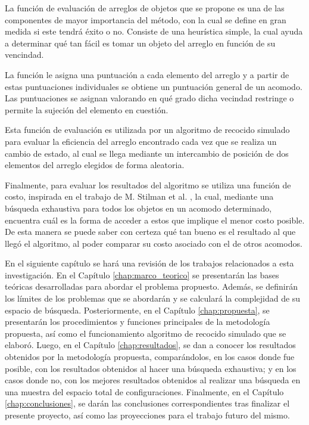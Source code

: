 La función de evaluación de arreglos de objetos que se propone es una de las componentes de mayor importancia del método, con la cual se define en gran medida si este tendrá éxito o no.
Consiste de una heurística simple, la cual ayuda a determinar qué tan fácil es tomar un objeto del arreglo en función de su vencindad.

La función le asigna una puntuación a cada elemento del arreglo y a partir de estas puntuaciones individuales se obtiene un puntuación general de un acomodo.
Las puntuaciones se asignan valorando en qué grado dicha vecindad restringe o permite la sujeción del elemento en cuestión.

Esta función de evaluación es utilizada por un algoritmo de recocido simulado para evaluar la eficiencia del arreglo encontrado cada vez que se realiza un cambio de estado, al cual se llega mediante un intercambio de posición de dos elementos del arreglo elegidos de forma aleatoria.

Finalmente, para evaluar los resultados del algoritmo se utiliza una función de costo, inspirada en el trabajo de M. Stilman et al. \cite{4209604}, la cual, mediante una búsqueda exhaustiva para todos los objetos en un acomodo determinado, encuentra cuál es la forma de acceder a estos que implique el menor costo posible.
De esta manera se puede saber con certeza qué tan bueno es el resultado al que llegó el algoritmo, al poder comparar su costo asociado con el de otros acomodos.

En el siguiente capítulo se hará una revisión de los trabajos relacionados a esta investigación.
En el Capítulo \ref{chap:marco_teorico} se presentarán las bases teóricas desarrolladas para abordar el problema propuesto.
Además, se definirán los límites de los problemas que se abordarán y se calculará la complejidad de su espacio de búsqueda.
Posteriormente, en el Capítulo \ref{chap:propuesta}, se presentarán los procedimientos y funciones principales de la metodología propuesta, así como el funcionamiento algoritmo de recocido simulado que se elaboró.
Luego, en el Capítulo \ref{chap:resultados}, se dan a conocer los resultados obtenidos por la metodología propuesta, comparándolos, en los casos donde fue posible, con los resultados obtenidos al hacer una búsqueda exhaustiva; y en los casos donde no, con los mejores resultados obtenidos al realizar una búsqueda en una muestra del espacio total de configuraciones.
Finalmente, en el Capítulo \ref{chap:conclusiones}, se darán las conclusiones correspondientes tras finalizar el presente proyecto, así como las proyecciones para el trabajo futuro del mismo.
